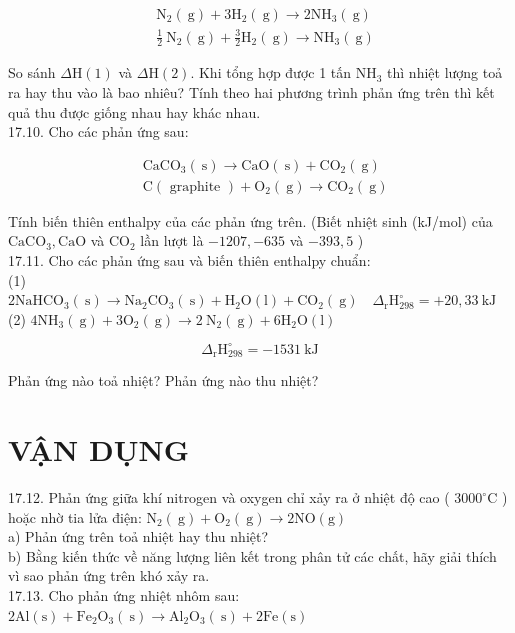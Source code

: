 \documentclass[10pt]{article}
\begin{document}
\begin{align*}
& \mathrm{N}_{2}(\mathrm{~g})+3 \mathrm{H}_{2}(\mathrm{~g}) \rightarrow 2 \mathrm{NH}_{3}(\mathrm{~g})  \tag{1}\\
& \frac{1}{2} \mathrm{~N}_{2}(\mathrm{~g})+\frac{3}{2} \mathrm{H}_{2}(\mathrm{~g}) \rightarrow \mathrm{NH}_{3}(\mathrm{~g}) \tag{2}
\end{align*}


So sánh $\Delta \mathrm{H}(1)$ và $\Delta \mathrm{H}(2)$. Khi tổng hợp được 1 tấn $\mathrm{NH}_{3}$ thì nhiệt lượng toả ra hay thu vào là bao nhiêu? Tính theo hai phương trình phản ứng trên thì kết quả thu được giống nhau hay khác nhau.\\
17.10. Cho các phản ứng sau:


\begin{align*}
& \mathrm{CaCO}_{3}(\mathrm{~s}) \rightarrow \mathrm{CaO}(\mathrm{~s})+\mathrm{CO}_{2}(\mathrm{~g})  \tag{1}\\
& \mathrm{C}(\text { graphite })+\mathrm{O}_{2}(\mathrm{~g}) \rightarrow \mathrm{CO}_{2}(\mathrm{~g}) \tag{2}
\end{align*}


Tính biến thiên enthalpy của các phản ứng trên. (Biết nhiệt sinh (kJ/mol) của $\mathrm{CaCO}_{3}, \mathrm{CaO}$ và $\mathrm{CO}_{2}$ lần lượt là $-1207,-635$ và $-393,5$ )\\
17.11. Cho các phản ứng sau và biến thiên enthalpy chuẩn:\\
(1) $2 \mathrm{NaHCO}_{3}(\mathrm{~s}) \rightarrow \mathrm{Na}_{2} \mathrm{CO}_{3}(\mathrm{~s})+\mathrm{H}_{2} \mathrm{O}(\mathrm{l})+\mathrm{CO}_{2}(\mathrm{~g}) \quad \Delta_{\mathrm{r}} \mathrm{H}_{298}^{\circ}=+20,33 \mathrm{~kJ}$\\
(2) $4 \mathrm{NH}_{3}(\mathrm{~g})+3 \mathrm{O}_{2}(\mathrm{~g}) \rightarrow 2 \mathrm{~N}_{2}(\mathrm{~g})+6 \mathrm{H}_{2} \mathrm{O}(\mathrm{l})$

$$
\Delta_{\mathrm{r}} \mathrm{H}_{298}^{\circ}=-1531 \mathrm{~kJ}
$$

Phản ứng nào toả nhiệt? Phản ứng nào thu nhiệt?

\section*{VẬN DỤNG}
17.12. Phản ứng giữa khí nitrogen và oxygen chỉ xảy ra ở nhiệt độ cao ( $3000^{\circ} \mathrm{C}$ ) hoặc nhờ tia lửa điện: $\mathrm{N}_{2}(\mathrm{~g})+\mathrm{O}_{2}(\mathrm{~g}) \rightarrow 2 \mathrm{NO}(\mathrm{g})$\\
a) Phản ứng trên toả nhiệt hay thu nhiệt?\\
b) Bằng kiến thức về năng lượng liên kết trong phân tử các chất, hãy giải thích vì sao phản ứng trên khó xảy ra.\\
17.13. Cho phản ứng nhiệt nhôm sau: $2 \mathrm{Al}(\mathrm{s})+\mathrm{Fe}_{2} \mathrm{O}_{3}(\mathrm{~s}) \rightarrow \mathrm{Al}_{2} \mathrm{O}_{3}(\mathrm{~s})+2 \mathrm{Fe}(\mathrm{s})$
\end{document}
